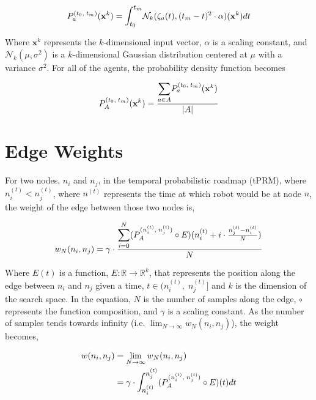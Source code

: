\documentclass{article}
\newcommand{\Normal}[2]{\mathcal{N}_k(#1, #2)}
\newcommand{\n}[2]{\ensuremath{n^{(#2)}_{#1}}}
\newcommand{\PA}{\ensuremath{P^{(\n{i}{t},\;\n{j}{t})}_{A}}}
\newcommand{\PD}{\ensuremath{P^{(t_0,\;t_m)}_{a}}}
\newcommand{\PAll}{\ensuremath{P^{(t_0,\;t_m)}_{A}}}
\begin{document}
$$\PD(\mathbf{x}^k) = \mathlarger{\int_{t_0}^{t_m}}\Normal{\zeta_a(t)}{(t_m -
t)^2 \cdot \alpha}(\mathbf{x}^k)dt$$

Where $\mathbf{x}^k$ represents the $k$-dimensional input vector, $\alpha$ is a
scaling constant, and $\mathcal{N}_k(\mu, \sigma^2)$ is a $k$-dimensional
Gaussian distribution centered at $\mu$ with a variance $\sigma^2$. For all of
the agents, the probability density function becomes

$$\PAll(\mathbf{x}^k) = \frac{\mathlarger{\sum_{a \in A}}
\PD(\mathbf{x}^k)}{|A|}$$

\section{Edge Weights}

For two nodes, $n_i$ and $n_j$, in the temporal probabilistic roadmap (tPRM),
where $\n{i}{t} < \n{j}{t}$, where $n^{(t)}$ represents the time at which robot
would be at node $n$, the weight of the edge between those two nodes is,

$$w_N(n_i, n_j) = \gamma \cdot \frac{\mathlarger{\sum^{N}_{i = 0}}(\PA \circ
E)(\n{i}{t} + i \cdot \frac{\n{j}{t} - \n{i}{t}}{N})}{N}$$

Where $E(t)$ is a function, $E: \mathbb{R} \to \mathbb{R}^k$, that represents
the position along the edge between $n_i$ and $n_j$ given a time, $t
\in (\n{i}{t},\;\n{j}{t}]$ and $k$ is the dimension of the search space. In the
equation, $N$ is the number of samples along the edge, $\circ$ represents the
function composition, and $\gamma$ is a scaling constant.  As the number of
samples tends towards infinity (i.e.  $\lim_{N \to
\infty} w_N(n_i, n_j)$), the weight becomes,

\begin{align*}
    w(n_i, n_j) &= \lim_{N \to \infty} w_N(n_i, n_j) \\
                &= \gamma \cdot \mathlarger{\int_{\n{i}{t}}^{\n{j}{t}}}(\PA
\circ E)(t)dt
\end{align*}
\end{document}
